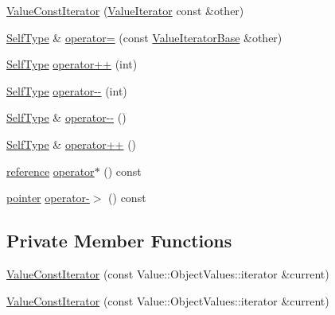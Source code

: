 \begin{DoxyCompactItemize}
\hyperlink{class_json_1_1_value_const_iterator_a7ef3df204a9ae83a0d8a3cd128e05c70}{Value\+Const\+Iterator} (\hyperlink{class_json_1_1_value_iterator}{Value\+Iterator} const \&other)
\item 
\hyperlink{class_json_1_1_value_iterator_base_a9d2a940d03ea06d20d972f41a89149ee}{Self\+Type} \& \hyperlink{class_json_1_1_value_const_iterator_afca9f2ee621a4a47f3e61d6144ce3d0c}{operator=} (const \hyperlink{class_json_1_1_value_iterator_base}{Value\+Iterator\+Base} \&other)
\item 
\hyperlink{class_json_1_1_value_iterator_base_a9d2a940d03ea06d20d972f41a89149ee}{Self\+Type} \hyperlink{class_json_1_1_value_const_iterator_ab3f0c2edbfc8f7d60645f3d597d05e28}{operator++} (int)
\item 
\hyperlink{class_json_1_1_value_iterator_base_a9d2a940d03ea06d20d972f41a89149ee}{Self\+Type} \hyperlink{class_json_1_1_value_const_iterator_a94935961e9331c6f7b907b05ec8df75e}{operator-\/-\/} (int)
\item 
\hyperlink{class_json_1_1_value_iterator_base_a9d2a940d03ea06d20d972f41a89149ee}{Self\+Type} \& \hyperlink{class_json_1_1_value_const_iterator_a31415e44e44e56fb2bfda7e8bb784646}{operator-\/-\/} ()
\item 
\hyperlink{class_json_1_1_value_iterator_base_a9d2a940d03ea06d20d972f41a89149ee}{Self\+Type} \& \hyperlink{class_json_1_1_value_const_iterator_a2cfe2f7a94a688186efdafb1b181c319}{operator++} ()
\item 
\hyperlink{class_json_1_1_value_const_iterator_aa9b05c6a37cd352ea1ee6e13b816f709}{reference} \hyperlink{class_json_1_1_value_const_iterator_ae5612dad47a6387eef71d584fb741d0c}{operator$\ast$} () const
\item 
\hyperlink{class_json_1_1_value_const_iterator_a400136bd8bc09e9fddec0785fa2cff14}{pointer} \hyperlink{class_json_1_1_value_const_iterator_a3c608ae53c192ee846eb265bae1cfeec}{operator-\/$>$} () const
\end{DoxyCompactItemize}
\subsection*{Private Member Functions}
\begin{DoxyCompactItemize}
\item 
\hyperlink{class_json_1_1_value_const_iterator_aa0a87edf5f1097f91dca5f2a389c4abd}{Value\+Const\+Iterator} (const Value\+::\+Object\+Values\+::iterator \&current)
\item 
\hyperlink{class_json_1_1_value_const_iterator_aa0a87edf5f1097f91dca5f2a389c4abd}{Value\+Const\+Iterator} (const Value\+::\+Object\+Values\+::iterator \&current)
\end{DoxyCompactItemize}
